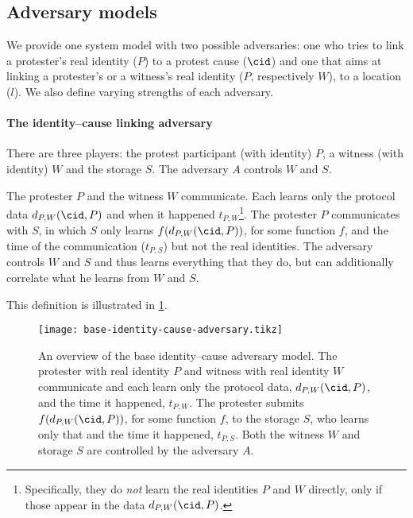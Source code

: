 \subsection{Adversary models}%
\label{adversary-model-different-levels}

We provide one system model with two possible adversaries: one who tries to link a protester's real identity (\(P\)) to a protest cause (\(\cid\)) and one 
that aims at linking a protester's or a witness's real identity (\(P\), respectively \(W\)), to a location (\(l\)).
We also define varying strengths of each adversary.

\paragraph{The identity--cause linking adversary}

There are three players: the protest participant (with identity) \(P\), a witness (with identity) \(W\) and the storage \(S\).
The adversary \(A\) controls \(W\) and \(S\).

\begin{definition}%
  \label{base-identity-cause-adversary}
  The protester \(P\) and the witness \(W\) communicate.
  Each learns only the protocol data \(d_{P,W}(\cid, P)\) and when it happened 
  \(t_{P,W}\)\footnote{%
    Specifically, they do \emph{not} learn the real identities \(P\) and \(W\) 
    directly, only if those appear in the data \(d_{P,W}(\cid, P)\).
  }.
  The protester \(P\) communicates with \(S\), in which \(S\) only learns 
  \(f(d_{P,W}(\cid, P))\), for some function \(f\), and the time of the 
  communication (\(t_{P,S}\)) but not the real identities.
  The adversary controls \(W\) and \(S\) and thus learns everything that they 
  do, but can additionally correlate what he learns from \(W\) and \(S\).
\end{definition}

This definition is illustrated in \cref{fig:identity-cause-adversary}.

\begin{figure}
  \centering
  \texttt{[image: base-identity-cause-adversary.tikz]}
  \caption{\label{fig:identity-cause-adversary}%
    An overview of the base identity--cause adversary model.
    The protester with real identity \(P\) and witness with real identity \(W\) 
    communicate and each learn only the protocol data, \(d_{P,W}(\cid, P)\), 
    and the time it happened, \(t_{P,W}\).
    The protester submits \(f(d_{P,W}(\cid, P))\), for some function \(f\), to 
    the storage \(S\), who learns only that and the time it happened, 
    \(t_{P,S}\).
    Both the witness \(W\) and storage \(S\) are controlled by the adversary 
    \(A\).
  }
\end{figure}

